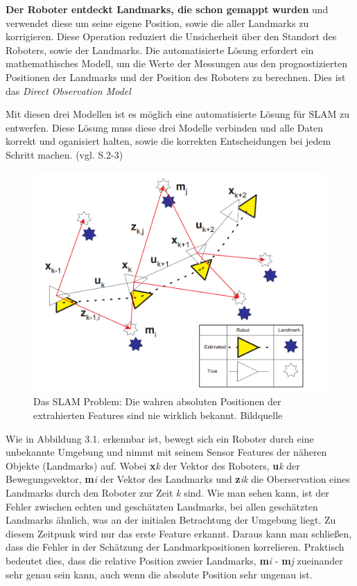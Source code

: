 \textbf{Der Roboter entdeckt Landmarks, die schon gemappt wurden} und verwendet diese um seine eigene Position, sowie die aller Landmarks zu korrigieren. Diese Operation reduziert die Unsicherheit über den Standort des Roboters, sowie der Landmarks. Die automatisierte Lösung erfordert ein mathemathisches Modell, um die Werte der Messungen aus den prognostizierten Positionen der Landmarks und der Position des Roboters zu berechnen. Dies ist das \glqq \textit{Direct Observation Model} \grqq

Mit diesen drei Modellen ist es möglich eine automatisierte Lösung für SLAM zu entwerfen. Diese Lösung muss diese drei Modelle verbinden und alle Daten korrekt und oganisiert halten, sowie die korrekten Entscheidungen bei jedem Schritt machen. (vgl. \cite{ekf_slam} S.2-3)



\begin{figure}[H]
	\centering
	\includegraphics[scale=0.35]{slam_problem.png}
	\caption{Das SLAM Problem: Die wahren absoluten Positionen der extrahierten Features sind nie wirklich bekannt. Bildquelle \cite{slam}}
\end{figure} 

Wie in Abbildung 3.1. erkennbar ist, bewegt sich ein Roboter durch eine unbekannte Umgebung und nimmt mit seinem Sensor Features der näheren Objekte (Landmarks) auf. Wobei \large\textbf{x}\normalsize\textit{k} der Vektor des Roboters,  \large\textbf{u}\normalsize\textit{k} der Bewegungsvektor, \large\textbf{m}\normalsize\textit{i} der Vektor des Landmarks und \large\textbf{z}\normalsize\textit{ik} die Oberservation eines Landmarks durch den Roboter zur Zeit \large\textit{k }\normalsize sind. Wie man sehen kann, ist der Fehler zwischen echten und geschätzten Landmarks, bei allen geschätzten Landmarks ähnlich, was an der initialen Betrachtung der Umgebung liegt. Zu diesem Zeitpunk wird nur das erste Feature erkannt. Daraus kann man schließen, dass die Fehler in der Schätzung der Landmarkpositionen korrelieren. Praktisch bedeutet dies, dass die relative Position zweier Landmarks, \large\textbf{m}\normalsize\textit{i} - \large\textbf{m}\normalsize\textit{j} zueinander sehr genau sein kann, auch wenn die absolute Position sehr ungenau ist. 

